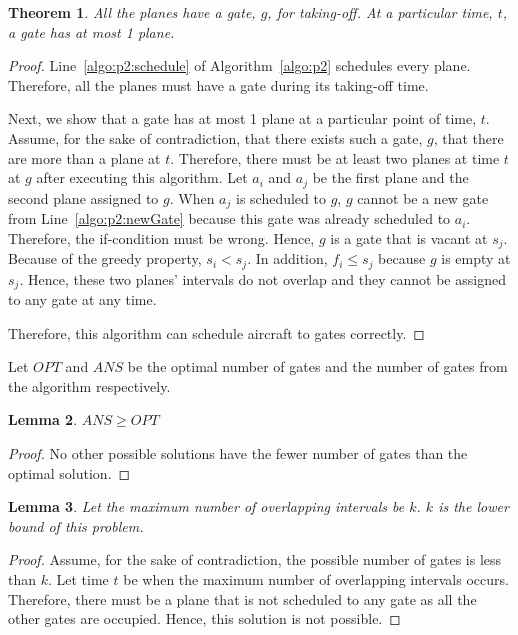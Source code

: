 \documentclass[11pt,a4paper]{article}
\newtheorem{theorem}{Theorem}[section]
\newtheorem{lemma}[theorem]{Lemma}
\begin{document}
\begin{theorem}
All the planes have a gate, $g$, for taking-off. At a particular time, $t$, a gate has at most 1 plane.
\end{theorem}
\begin{proof}
Line~\ref{algo:p2:schedule} of Algorithm~\ref{algo:p2} schedules every plane. Therefore, all the planes must have a gate during its taking-off time. \par
Next, we show that a gate has at most 1 plane at a particular point of time, $t$. Assume, for the sake of contradiction, that there exists such a gate, $g$, that there are more than a plane at $t$. Therefore, there must be at least two planes at time $t$ at $g$ after executing this algorithm. Let $a_i$ and $a_j$ be the first plane and the second plane assigned to $g$. When $a_j$ is scheduled to $g$, $g$ cannot be a new gate from Line~\ref{algo:p2:newGate} because this gate was already scheduled to $a_i$. Therefore, the if-condition must be wrong. Hence, $g$ is a gate that is vacant at $s_j$. Because of the greedy property, $s_i < s_j$. In addition, $f_i \leq s_j$ because $g$ is empty at $s_j$. Hence, these two planes' intervals do not overlap and they cannot be assigned to any gate at any time. \par
Therefore, this algorithm can schedule aircraft to gates correctly.
\end{proof}

Let $OPT$ and $ANS$ be the optimal number of gates and the number of gates from the algorithm respectively. \par

\begin{lemma}
$ANS \geq OPT$ 
\end{lemma}
\begin{proof}
No other possible solutions have the fewer number of gates than the optimal solution.
\end{proof}

\begin{lemma}
Let the maximum number of overlapping intervals be $k$. $k$ is the lower bound of this problem.
\end{lemma}
\begin{proof}
Assume, for the sake of contradiction, the possible number of gates is less than $k$. Let time $t$ be when the maximum number of overlapping intervals occurs. Therefore, there must be a plane that is not scheduled to any gate as all the other gates are occupied. Hence, this solution is not possible.
\end{proof}
\end{document}
